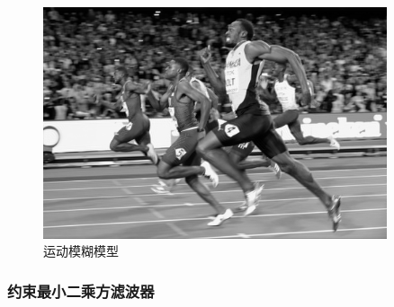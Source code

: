 \documentclass[11pt]{ctexart}
\begin{document}
\begin{figure}[htbp]
{\begin{minipage}[t]{0.36\linewidth}
            \includegraphics[width=0.9\textwidth]{output/2_wiener_01.jpg}
            \end{minipage}
        }
        \centering
        \caption{运动模糊模型}\label{fig:digit}
  \end{figure}

\newpage

\subsubsection*{约束最小二乘方滤波器}
\end{document}
